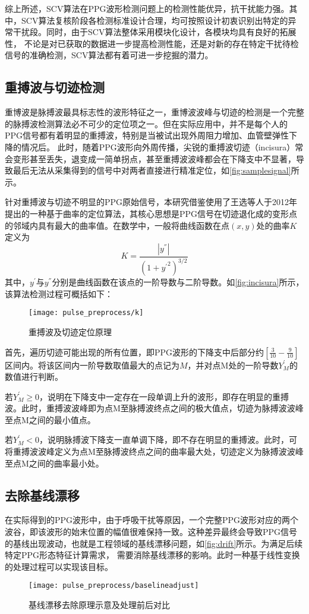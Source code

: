 综上所述，SCV算法在PPG波形检测问题上的检测性能优异，抗干扰能力强。其中，SCV算法复核阶段各检测标准设计合理，均可按照设计初衷识别出特定的异常干扰段。同时，由于SCV算法整体采用模块化设计，各模块均具有良好的拓展性，
不论是对已获取的数据进一步提高检测性能，还是对新的存在特定干扰待检信号的准确检测，SCV算法都有着可进一步挖掘的潜力。

\subsection{重搏波与切迹检测}
重博波是脉搏波最具标志性的波形特征之一，重博波波峰与切迹的检测是一个完整的脉搏波检测算法必不可少的定位项之一\cite{Wang2012}。但在实际应用中，并不是每个人的PPG信号都有着明显的重搏波，特别是当被试出现外周阻力增加、血管壁弹性下降的情况后\cite{mmt}。
此时，随着PPG波形向外周传播，尖锐的重搏波切迹（incisura）常会变形甚至丢失，退变成一简单拐点，甚至重搏波波峰都会在下降支中不显著，导致最后无法从采集得到的信号中对两者直接进行精准定位，如\autoref{fig:samplesignal}所示。

针对重搏波与切迹不明显的PPG原始信号，本研究借鉴使用了王选等人于2012年提出的一种基于曲率的定位算法\cite{Wang2012}，其核心思想是PPG信号在切迹退化成的变形点的邻域内具有最大的曲率值。在数学中，一般将曲线函数在点$(x,y)$处的曲率$K$定义为
\begin{equation}
    \label{equ:curvature}
    K=\frac{|y^{''}|}{{(1+{y^{'}}^2)}^{3/2}}
\end{equation}
其中，$y^{'}$与$y^{''}$分别是曲线函数在该点的一阶导数与二阶导数。如\autoref{fig:incisura}所示，该算法检测过程可概括如下：
\begin{figure}[htbp]
    \centering
    \texttt{[image: pulse\_preprocess/k]}
    \caption{\label{fig:incisura}重搏波及切迹定位原理}
\end{figure}

首先，遍历切迹可能出现的所有位置，即PPG波形的下降支中后部分约$[\frac{3}{10}-\frac{9}{10}]$区间内。将该区间内一阶导数取值最大的点记为$M$，并对点M处的一阶导数$Y_M^{'}$的数值进行判断。

若$Y_M^{'}\ge 0$，说明在下降支中一定存在一段单调上升的波形，即存在明显的重搏波。此时，重搏波波峰即为点M至脉搏波终点之间的极大值点，切迹为脉搏波波峰至点M之间的最小值点。

若$Y_M^{'}<0$，说明脉搏波下降支一直单调下降，即不存在明显的重搏波。此时，可将重搏波波峰定义为点M至脉搏波终点之间的曲率最大处，切迹定义为脉搏波波峰至点M之间的曲率最小处。
\subsection{去除基线漂移}
在实际得到的PPG波形中，由于呼吸干扰等原因，一个完整PPG波形对应的两个波谷，即该波形的始末位置的幅值很难保持一致。这种差异最终会导致PPG信号的基线出现波动，也就是工程领域的基线漂移问题，如\autoref{fig:drift}所示。为满足后续特定PPG形态特征计算需求，
需要消除基线漂移的影响。此时一种基于线性变换的处理过程可以实现该目标。
\begin{figure}[htbp]
    \centering
    \texttt{[image: pulse\_preprocess/baselineadjust]}
    \caption{\label{fig:drift}基线漂移去除原理示意及处理前后对比}
\end{figure}

